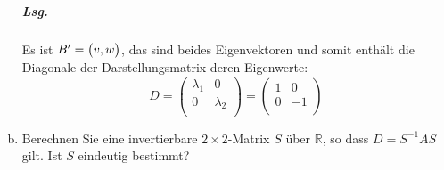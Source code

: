 \documentclass{scrreprt}
\begin{document}
\begin{enumerate}[(a)]
  \subparagraph{Lsg.} Es ist $B' = \qty\big(v, w)$, das sind beides Eigenvektoren
  und somit enthält die Diagonale der Darstellungsmatrix deren Eigenwerte:
  \[
    D = \begin{pmatrix}
      \lambda_1 & 0         \\
      0         & \lambda_2 \\
    \end{pmatrix} = \begin{pmatrix}
      1 & 0  \\
      0 & -1 \\
    \end{pmatrix}
  \]

\newpage
\item Berechnen Sie eine invertierbare $2 \times 2$-Matrix $S$ über $\mathbb{R}$,
  so dass $D = S^{-1}AS$ gilt.
  Ist $S$ eindeutig bestimmt?


\end{enumerate}
\end{document}
